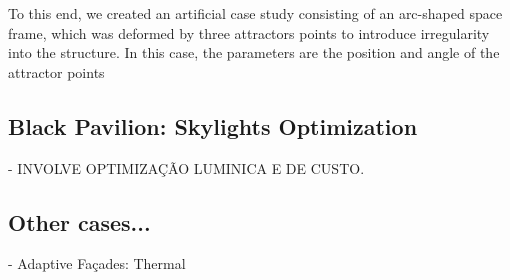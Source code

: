 To this end, we created an artificial case study consisting of an arc-shaped space frame, which was deformed by three attractors points to introduce irregularity into the structure. In this case, the parameters are the position and angle of the attractor points


\subsection{Black Pavilion: Skylights Optimization}

- INVOLVE OPTIMIZAÇÃO LUMINICA E DE CUSTO.


\subsection{Other cases...}

- Adaptive Façades: Thermal